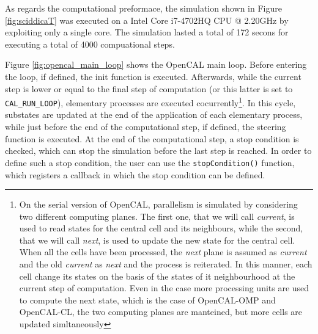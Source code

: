 As regards the computational preformace, the simulation shown in
Figure \ref{fig:sciddicaT} was executed on a Intel Core i7-4702HQ CPU
@ 2.20GHz by exploiting only a single core. The simulation lasted a
total of 172 secons for executing a total of 4000 compuational steps.

Figure \ref{fig:opencal_main_loop} shows the OpenCAL main loop. Before
entering the loop, if defined, the init function is
executed. Afterwards, while the current step is lower or equal to the
final step of computation (or this latter is set to
\verb'CAL_RUN_LOOP'), elementary processes are executed
cocurrently\footnote{On the serial version of OpenCAL, parallelism is
  simulated by considering two different computing planes. The first
  one, that we will call \emph{current}, is used to read states for
  the central cell and its neighbours, while the second, that we will
  call \emph{next}, is used to update the new state for the central
  cell. When all the cells have been processed, the \emph{next} plane
  is assumed as \emph{current} and the old \emph{current} as
  \emph{next} and the process is reiterated. In this manner, each cell
  change its states on the basis of the states of it neighbourhood at
  the current step of computation. Even in the case more processing
  units are used to compute the next state, which is the case of
  OpenCAL-OMP and OpenCAL-CL, the two computing planes are manteined,
  but more cells are updated simltaneously}. In this cycle,
substates are updated at the end of the application of each elementary
process, while just before the end of the computational step, if
defined, the steering function is executed. At the end of the
computational step, a stop condition is checked, which can stop the
simulation before the last step is reached. In order to define such a
stop condition, the user can use the \verb'stopCondition()' function,
which registers a callback in which the stop condition can be defined.

